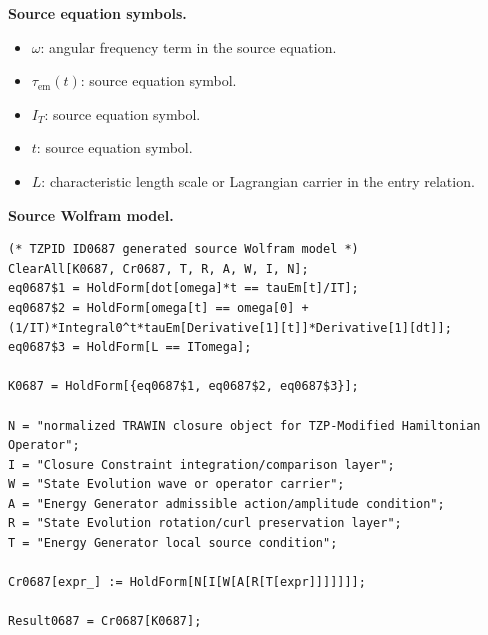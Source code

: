 \begin{minipage}[t]{0.49\linewidth}
\begingroup
\small
\raggedright
\textbf{Source equation symbols.}\par
\begin{itemize}[leftmargin=1.35em,itemsep=1pt,topsep=1pt,parsep=0pt]
    \item $\omega$: angular frequency term in the source equation.
    \item $\tau_{\mathrm{em}}(t)$: source equation symbol.
    \item $I_T$: source equation symbol.
    \item $t$: source equation symbol.
    \item $L$: characteristic length scale or Lagrangian carrier in the entry relation.
\end{itemize}
\endgroup
\end{minipage}\hfill
\begin{minipage}[t]{0.47\linewidth}
\begingroup
\scriptsize
\raggedright
\textbf{Source Wolfram model.}\par
\begin{Verbatim}[fontsize=\tiny,breaklines=true,breakanywhere=true]
(* TZPID ID0687 generated source Wolfram model *)
ClearAll[K0687, Cr0687, T, R, A, W, I, N];
eq0687$1 = HoldForm[dot[omega]*t == tauEm[t]/IT];
eq0687$2 = HoldForm[omega[t] == omega[0] + (1/IT)*Integral0^t*tauEm[Derivative[1][t]]*Derivative[1][dt]];
eq0687$3 = HoldForm[L == ITomega];

K0687 = HoldForm[{eq0687$1, eq0687$2, eq0687$3}];

N = "normalized TRAWIN closure object for TZP-Modified Hamiltonian Operator";
I = "Closure Constraint integration/comparison layer";
W = "State Evolution wave or operator carrier";
A = "Energy Generator admissible action/amplitude condition";
R = "State Evolution rotation/curl preservation layer";
T = "Energy Generator local source condition";

Cr0687[expr_] := HoldForm[N[I[W[A[R[T[expr]]]]]]];

Result0687 = Cr0687[K0687];
\end{Verbatim}
\endgroup
\end{minipage}

